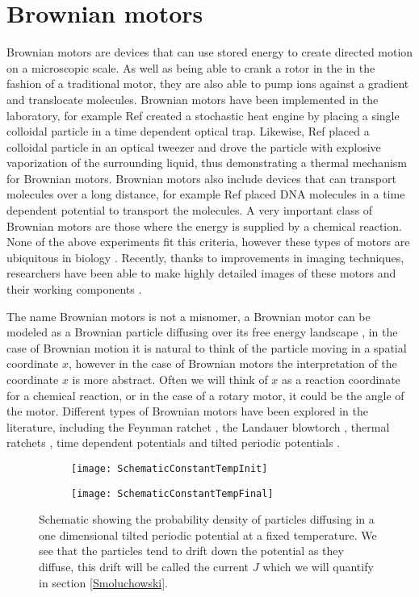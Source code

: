 \section{Brownian motors}
Brownian motors are devices that can use stored energy to create directed motion on a microscopic scale. As well as being able to crank a rotor in the in the fashion of a traditional motor, they are also able to pump ions against a gradient and translocate molecules. Brownian motors have been implemented in the laboratory, for example Ref \cite{BlickleBechinger2011} created a stochastic heat engine by placing a single colloidal particle in a time dependent optical trap. Likewise, Ref \cite{Pedro2014} placed a colloidal particle in an optical tweezer and drove the particle with explosive vaporization of the surrounding liquid, thus demonstrating a thermal mechanism for Brownian motors. Brownian motors also include devices that can transport molecules over a long distance, for example Ref \cite{JoelBader1999} placed DNA molecules in a time dependent potential to transport the molecules. A very important class of Brownian motors are those where the energy is supplied by a chemical reaction. None of the above experiments fit this criteria, however these types of motors are ubiquitous in biology \cite{PhillipsQuakeMay2006, Magnasco1994}. Recently, thanks to improvements in imaging techniques, researchers have been able to make highly detailed images of these motors and their working components \cite{YiWeiChang2016}.

The name Brownian motors is not a misnomer, a Brownian motor can be modeled as a Brownian particle diffusing over its free energy landscape \cite{Reimann2001}, in the case of Brownian motion it is natural to think of the particle moving in a spatial coordinate $x$, however in the case of Brownian motors the interpretation of the coordinate $x$ is more abstract. Often we will think of $x$ as a reaction coordinate for a chemical reaction, or in the case of a rotary motor, it could be the angle of the motor. Different types of Brownian motors have been explored in the literature, including the Feynman ratchet \cite{Feynman1963}, the Landauer blowtorch \cite{Landauer1988}, thermal ratchets \cite{Pedro2014}, time dependent potentials \cite{JoelBader1999,BlickleBechinger2011} and tilted periodic potentials \cite{Leibler1993,Magnasco1994}.

\begin{figure}[tb]
	\begin{subfigure}{0.49\textwidth}
		\texttt{[image: SchematicConstantTempInit]}
		\caption{\label{fig:Init}}
	\end{subfigure}
\begin{subfigure}{0.49\textwidth}
		\texttt{[image: SchematicConstantTempFinal]}
		\caption{\label{fig:Final}}
\end{subfigure}
\caption{Schematic showing the probability density of particles diffusing in a one dimensional tilted periodic potential at a fixed temperature. We see that the particles tend to drift down the potential as they diffuse, this drift will be called the current $J$ which we will quantify in section \ref{Smoluchowski}.}
\label{fig:Schematic}
\end{figure}

